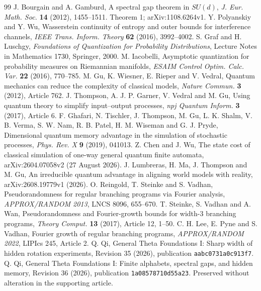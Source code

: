 \begin{thebibliography}{99}
 J. Bourgain and A. Gamburd,
A spectral gap theorem in $SU(d)$,
\emph{J. Eur. Math. Soc.} \textbf{14} (2012), 1455--1511.
Theorem 1; arXiv:1108.6264v1.
 Y. Polyanskiy and Y. Wu,
Wasserstein continuity of entropy and outer bounds for interference channels,
\emph{IEEE Trans. Inform. Theory} \textbf{62} (2016), 3992--4002.
 S. Graf and H. Luschgy,
\emph{Foundations of Quantization for Probability Distributions},
Lecture Notes in Mathematics 1730, Springer, 2000.
 M. Iacobelli,
Asymptotic quantization for probability measures on Riemannian manifolds,
\emph{ESAIM Control Optim. Calc. Var.} \textbf{22} (2016), 770--785.
 M. Gu, K. Wiesner, E. Rieper and V. Vedral,
Quantum mechanics can reduce the complexity of classical models,
\emph{Nature Commun.} \textbf{3} (2012), Article 762.
 J. Thompson, A. J. P. Garner, V. Vedral and M. Gu,
Using quantum theory to simplify input--output processes,
\emph{npj Quantum Inform.} \textbf{3} (2017), Article 6.
 F. Ghafari, N. Tischler, J. Thompson, M. Gu,
L. K. Shalm, V. B. Verma, S. W. Nam, R. B. Patel, H. M. Wiseman and
G. J. Pryde, Dimensional quantum memory advantage in the simulation
of stochastic processes, \emph{Phys. Rev. X} \textbf{9} (2019), 041013.
 Z. Chen and J. Wu,
The state cost of classical simulation of one-way general quantum finite
automata, arXiv:2604.07058v2 (27 August 2026).
 J. Lumbreras, H. Ma, J. Thompson and M. Gu,
An irreducible quantum advantage in aligning world models with reality,
arXiv:2608.19779v1 (2026).
 O. Reingold, T. Steinke and S. Vadhan,
Pseudorandomness for regular branching programs via Fourier analysis,
\emph{APPROX/RANDOM 2013}, LNCS 8096, 655--670.
 T. Steinke, S. Vadhan and A. Wan,
Pseudorandomness and Fourier-growth bounds for width-3 branching programs,
\emph{Theory Comput.} \textbf{13} (2017), Article 12, 1--50.
 C. H. Lee, E. Pyne and S. Vadhan,
Fourier growth of regular branching programs,
\emph{APPROX/RANDOM 2022}, LIPIcs 245, Article 2.
 Q. Qi,
General Theta Foundations I: Sharp width of hidden rotation experiments,
Revision 35 (2026), publication \texttt{aabc0731a0c913f7}.
 Q. Qi,
General Theta Foundations I: Finite alphabets, spectral gaps, and hidden memory,
Revision 36 (2026), publication \texttt{1a08578710d55a23}.
Preserved without alteration in the supporting article.
\end{thebibliography}
